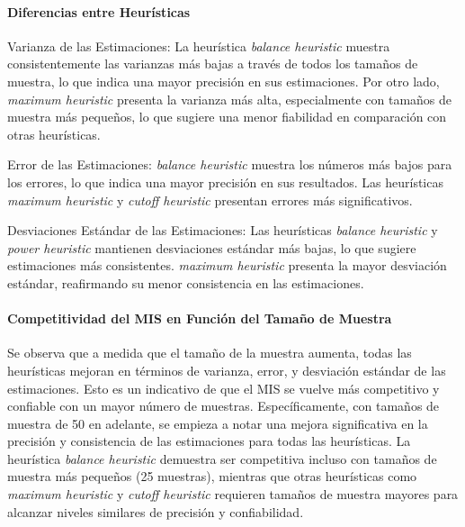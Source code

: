\documentclass{article}
\begin{document}
\begin{table}[H]
\centering
\label{table:heuristic_analysis}
\caption{Análisis de los resultados por heurística}
\end{table}


\paragraph{Diferencias entre Heurísticas}
Varianza de las Estimaciones: La heurística \textit{balance heuristic} muestra consistentemente las varianzas más bajas a través de todos los tamaños de muestra, lo que indica una mayor precisión en sus estimaciones.
Por otro lado, \textit{maximum heuristic} presenta la varianza más alta, especialmente con tamaños de muestra más pequeños, lo que sugiere una menor fiabilidad en comparación con otras heurísticas.

Error de las Estimaciones: \textit{balance heuristic} muestra los números más bajos para los errores, lo que indica una mayor precisión en sus resultados.
Las heurísticas \textit{maximum heuristic} y \textit{cutoff heuristic} presentan errores más significativos.

Desviaciones Estándar de las Estimaciones: Las heurísticas \textit{balance heuristic} y \textit{power heuristic} mantienen desviaciones estándar más bajas, lo que sugiere estimaciones más consistentes.
\textit{maximum heuristic} presenta la mayor desviación estándar, reafirmando su menor consistencia en las estimaciones.

\paragraph{Competitividad del MIS en Función del Tamaño de Muestra}
Se observa que a medida que el tamaño de la muestra aumenta, todas las heurísticas mejoran en términos de varianza, error, y desviación estándar de las estimaciones. Esto es un indicativo de que el MIS se vuelve más competitivo y confiable con un mayor número de muestras.
Específicamente, con tamaños de muestra de 50 en adelante, se empieza a notar una mejora significativa en la precisión y consistencia de las estimaciones para todas las heurísticas.
La heurística \textit{balance heuristic} demuestra ser competitiva incluso con tamaños de muestra más pequeños (25 muestras), mientras que otras heurísticas como \textit{maximum heuristic} y \textit{cutoff heuristic} requieren tamaños de muestra mayores para alcanzar niveles similares de precisión y confiabilidad.
\end{document}
